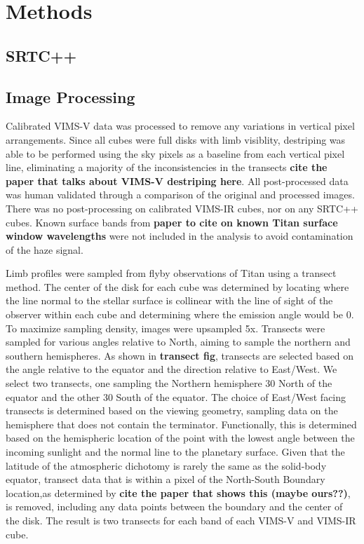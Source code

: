 \documentclass[tighten,linenumbers,twocolumn]{aastex631}
\begin{document}

\section{Methods}
\subsection{SRTC++} 


\subsection{Image Processing}
\label{sec: image processing}

Calibrated VIMS-V data was processed to remove any variations in vertical pixel arrangements. Since all cubes were full disks with limb visiblity, destriping was able to be performed using the sky pixels as a baseline from each vertical pixel line, eliminating a majority of the inconsistencies in the transects \textbf{cite the paper that talks about VIMS-V destriping here}. All post-processed data was human validated through a comparison of the original and processed images. There was no post-processing on calibrated VIMS-IR cubes, nor on any SRTC++ cubes. Known surface bands from \textbf{paper to cite on known Titan surface window wavelengths} were not included in the analysis to avoid contamination of the haze signal. 


Limb profiles were sampled from flyby observations of Titan using a transect method. The center of the disk for each cube was determined by locating where the line normal to the stellar surface is collinear with the line of sight of the observer within each cube and determining where the emission angle would be 0. To maximize sampling density, images were upsampled 5x. Transects were sampled for various angles relative to North, aiming to sample the northern and southern hemispheres. As shown in \textbf{transect fig}, transects are selected based on the angle relative to the equator and the direction relative to East/West. We select two transects, one sampling the Northern hemisphere 30\textdegree{} North of the equator and the other 30\textdegree{} South of the equator. The choice of East/West facing transects is determined based on the viewing geometry, sampling data on the hemisphere that does not contain the terminator. Functionally, this is determined based on the hemispheric location of the point with the lowest angle between the incoming sunlight and the normal line to the planetary surface. Given that the latitude of the atmospheric dichotomy is rarely the same as the solid-body equator, transect data that is within a pixel of the North-South Boundary location,as determined by \textbf{cite the paper that shows this (maybe ours??)}, is removed, including any data points between the boundary and the center of the disk. The result is two transects for each band of each VIMS-V and VIMS-IR cube. 
\end{document}

